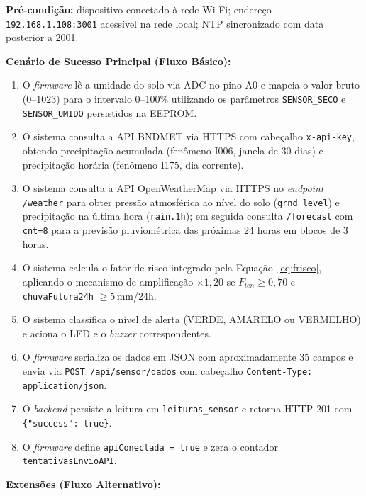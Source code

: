 \textbf{Pré-condição:} dispositivo conectado à rede Wi-Fi; endereço
\texttt{192.168.1.108:3001} acessível na rede local; NTP
sincronizado com data posterior a 2001.

\textbf{Cenário de Sucesso Principal (Fluxo Básico):}
\begin{enumerate}
  \item O \textit{firmware} lê a umidade do solo via ADC no pino A0
        e mapeia o valor bruto (0--1023) para o intervalo 0--100\%
        utilizando os parâmetros \texttt{SENSOR\_SECO} e
        \texttt{SENSOR\_UMIDO} persistidos na EEPROM.
  \item O sistema consulta a API BNDMET via HTTPS com cabeçalho
        \texttt{x-api-key}, obtendo precipitação acumulada
        (fenômeno I006, janela de 30 dias) e precipitação horária
        (fenômeno I175, dia corrente).
  \item O sistema consulta a API OpenWeatherMap via HTTPS no
        \textit{endpoint} \texttt{/weather} para obter pressão
        atmosférica ao nível do solo (\texttt{grnd\_level}) e
        precipitação na última hora (\texttt{rain.1h}); em seguida
        consulta \texttt{/forecast} com \texttt{cnt=8} para a
        previsão pluviométrica das próximas 24 horas em blocos
        de 3 horas.
  \item O sistema calcula o fator de risco integrado pela
        Equação~\ref{eq:frisco}, aplicando o mecanismo de
        amplificação $\times 1{,}20$ se $F_{len} \geq 0{,}70$
        e \texttt{chuvaFutura24h} $\geq 5$\,mm/24h.
  \item O sistema classifica o nível de alerta (VERDE, AMARELO
        ou VERMELHO) e aciona o LED e o \textit{buzzer}
        correspondentes.
  \item O \textit{firmware} serializa os dados em JSON com
        aproximadamente 35 campos e envia via
        \texttt{POST /api/sensor/dados} com cabeçalho
        \texttt{Content-Type: application/json}.
  \item O \textit{backend} persiste a leitura em
        \texttt{leituras\_sensor} e retorna HTTP 201 com
        \texttt{\{"success": true\}}.
  \item O \textit{firmware} define \texttt{apiConectada = true}
        e zera o contador \texttt{tentativasEnvioAPI}.
\end{enumerate}

\textbf{Extensões (Fluxo Alternativo):}

